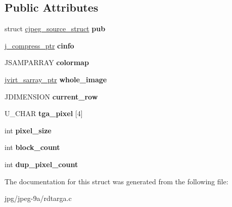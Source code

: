 \subsection*{Public Attributes}
\begin{DoxyCompactItemize}
\item 
\hypertarget{struct__tga__source__struct_ab5237e5ab387356865e875f69f63a3ff}{struct \hyperlink{structcjpeg__source__struct}{cjpeg\+\_\+source\+\_\+struct} {\bfseries pub}}\label{struct__tga__source__struct_ab5237e5ab387356865e875f69f63a3ff}

\item 
\hypertarget{struct__tga__source__struct_a6a84dbc4d76fb55a46d97db6bb3530ad}{\hyperlink{structjpeg__compress__struct}{j\+\_\+compress\+\_\+ptr} {\bfseries cinfo}}\label{struct__tga__source__struct_a6a84dbc4d76fb55a46d97db6bb3530ad}

\item 
\hypertarget{struct__tga__source__struct_a25c696360f5927fb3f81cac3fb2da19d}{J\+S\+A\+M\+P\+A\+R\+R\+A\+Y {\bfseries colormap}}\label{struct__tga__source__struct_a25c696360f5927fb3f81cac3fb2da19d}

\item 
\hypertarget{struct__tga__source__struct_a42731d24fd6ab54805f5bc36d8b8560e}{\hyperlink{structjvirt__sarray__control}{jvirt\+\_\+sarray\+\_\+ptr} {\bfseries whole\+\_\+image}}\label{struct__tga__source__struct_a42731d24fd6ab54805f5bc36d8b8560e}

\item 
\hypertarget{struct__tga__source__struct_a06e8914b3d3b3727c9a0b20dbcd69f13}{J\+D\+I\+M\+E\+N\+S\+I\+O\+N {\bfseries current\+\_\+row}}\label{struct__tga__source__struct_a06e8914b3d3b3727c9a0b20dbcd69f13}

\item 
\hypertarget{struct__tga__source__struct_a812d6909b9e2f5c8be24923fea599b46}{U\+\_\+\+C\+H\+A\+R {\bfseries tga\+\_\+pixel} \mbox{[}4\mbox{]}}\label{struct__tga__source__struct_a812d6909b9e2f5c8be24923fea599b46}

\item 
\hypertarget{struct__tga__source__struct_a4108800ef59c798a7e9a5af65fd30648}{int {\bfseries pixel\+\_\+size}}\label{struct__tga__source__struct_a4108800ef59c798a7e9a5af65fd30648}

\item 
\hypertarget{struct__tga__source__struct_af8b39ff3f63c42bc1957a03e2a9b5d3d}{int {\bfseries block\+\_\+count}}\label{struct__tga__source__struct_af8b39ff3f63c42bc1957a03e2a9b5d3d}

\item 
\hypertarget{struct__tga__source__struct_a5f7ac2b8972c5f323e51e9fa056790f9}{int {\bfseries dup\+\_\+pixel\+\_\+count}}\label{struct__tga__source__struct_a5f7ac2b8972c5f323e51e9fa056790f9}

\end{DoxyCompactItemize}


The documentation for this struct was generated from the following file\+:\begin{DoxyCompactItemize}
\item 
jpg/jpeg-\/9a/rdtarga.\+c\end{DoxyCompactItemize}

